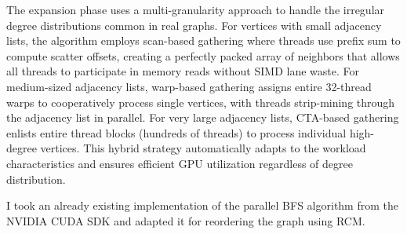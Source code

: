 The expansion phase uses a multi-granularity approach to handle the irregular degree distributions common in real graphs. For vertices with small adjacency lists, the algorithm employs scan-based gathering where threads use prefix sum to compute scatter offsets, creating a perfectly packed array of neighbors that allows all threads to participate in memory reads without SIMD lane waste. For medium-sized adjacency lists, warp-based gathering assigns entire 32-thread warps to cooperatively process single vertices, with threads strip-mining through the adjacency list in parallel. For very large adjacency lists, CTA-based gathering enlists entire thread blocks (hundreds of threads) to process individual high-degree vertices. This hybrid strategy automatically adapts to the workload characteristics and ensures efficient GPU utilization regardless of degree distribution.

I took an already existing implementation of the parallel BFS algorithm from the NVIDIA CUDA SDK \cite{kaleta_kaletapbfs-cuda-gpu_2025} and adapted it for reordering the graph using RCM.
